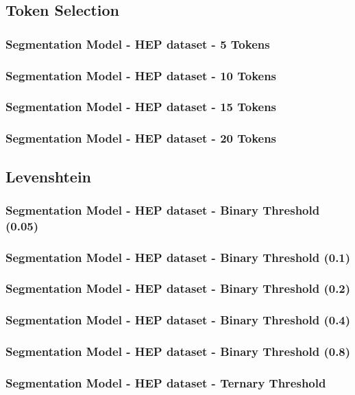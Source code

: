 \documentclass[10pt, oneside]{scrartcl}   	%
\begin{document}
\subsection{Token Selection}
\subsubsection{Segmentation Model - HEP dataset - 5 Tokens}
\subsubsection{Segmentation Model - HEP dataset - 10 Tokens}
\subsubsection{Segmentation Model - HEP dataset - 15 Tokens}
\subsubsection{Segmentation Model - HEP dataset - 20 Tokens}
\subsection{Levenshtein}
\subsubsection{Segmentation Model - HEP dataset - Binary Threshold (0.05)}
\subsubsection{Segmentation Model - HEP dataset - Binary Threshold (0.1)}
\subsubsection{Segmentation Model - HEP dataset - Binary Threshold (0.2)}
\subsubsection{Segmentation Model - HEP dataset - Binary Threshold (0.4)}
\subsubsection{Segmentation Model - HEP dataset - Binary Threshold (0.8)}
\subsubsection{Segmentation Model - HEP dataset - Ternary Threshold}
\end{document}
